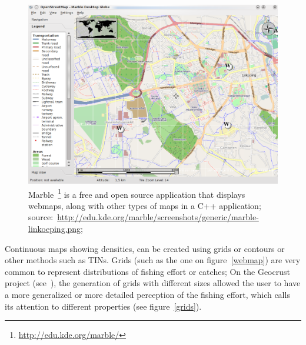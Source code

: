 \documentclass[11pt]{article} %
\begin{document}
  \begin{figure}[!ht]%
    \begin{center} 
	\includegraphics[width=\textwidth]{marble}
      \caption[Marble is a free and open source application that displays webmaps, along with other types of maps in a C++ application;]
{Marble~\footnote{\url{http://edu.kde.org/marble/}} is a free and open source application that displays webmaps, along with other types of maps in a C++ application; source:~\url{http://edu.kde.org/marble/screenshots/generic/marble-linkoeping.png};}
      \label{marble} %
    \end{center} 
  \end{figure}

Continuous maps showing densities, can be created using grids or contours or other methods such as TINs. Grids (such as the one on figure~\ref{webmap}) are very common to represent distributions of fishing effort or catches; On the Geocrust project (see~\cite{geocrust}), the generation of grids with different sizes allowed the user to have a more generalized or more detailed perception of the fishing effort, which calls its attention to different properties (see figure~\ref{grids}).
\end{document}
